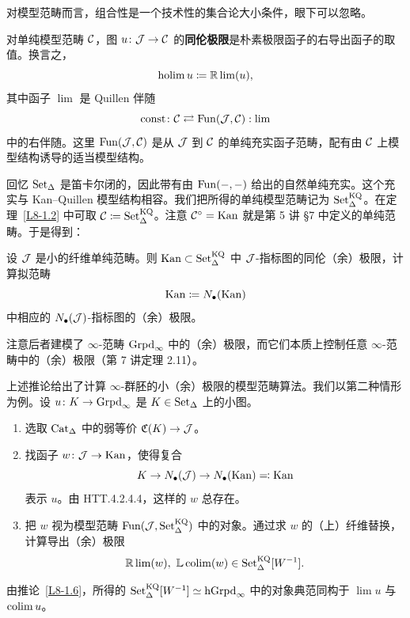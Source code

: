 对模型范畴而言，组合性是一个技术性的集合论大小条件，眼下可以忽略。

对单纯模型范畴 $\mathcal{C}$，图 $u\colon \mathcal{J}\to\mathcal{C}$ 的\textbf{同伦极限}是朴素极限函子的右导出函子的取值。换言之，
\[
\operatorname{holim} u\coloneqq \mathbb{R}\lim(u),
\]
其中函子 $\lim$ 是 Quillen 伴随
\[
\mathrm{const}\colon \mathcal{C}\rightleftarrows \operatorname{Fun}(\mathcal{J},\mathcal{C}) : \lim
\]
中的右伴随。这里 $\operatorname{Fun}(\mathcal{J},\mathcal{C})$ 是从 $\mathcal{J}$ 到 $\mathcal{C}$ 的单纯充实函子范畴，配有由 $\mathcal{C}$ 上模型结构诱导的适当模型结构。

\nitem\label{L8-1.5} 回忆 $\operatorname{Set}_\Delta$ 是笛卡尔闭的，因此带有由 $\operatorname{Fun}(-,-)$ 给出的自然单纯充实。这个充实与 Kan--Quillen 模型结构相容。我们把所得的单纯模型范畴记为 $\operatorname{Set}^{\mathrm{KQ}}_\Delta$。在定理~\ref{L8-1.2} 中可取 $\mathcal{C}\coloneqq \operatorname{Set}^{\mathrm{KQ}}_\Delta$。注意 $\mathcal{C}^{\circ}=\operatorname{Kan}$ 就是第 5 讲 §7 中定义的单纯范畴。于是得到：

\begin{corollary}\label{L8-1.6}
设 $\mathcal{J}$ 是小的纤维单纯范畴。则 $\operatorname{Kan}\subset \operatorname{Set}^{\mathrm{KQ}}_\Delta$ 中 $\mathcal{J}$-指标图的同伦（余）极限，计算拟范畴
\[
\operatorname{Kan} \coloneqq N_\bullet(\operatorname{Kan})
\]
中相应的 $N_\bullet(\mathcal{J})$-指标图的（余）极限。
\end{corollary}

\begin{remark}\label{L8-1.7}
注意后者建模了 $\infty$-范畴 $\operatorname{Grpd}_\infty$ 中的（余）极限，而它们本质上控制任意 $\infty$-范畴中的（余）极限（第 7 讲定理 2.11）。
\end{remark}

\begin{remark}\label{L8-1.8}
上述推论给出了计算 $\infty$-群胚的小（余）极限的模型范畴算法。我们以第二种情形为例。设 $u\colon K\to \operatorname{Grpd}_\infty$ 是 $K\in\operatorname{Set}_\Delta$ 上的小图。
\begin{enumerate}[label=(\roman*),leftmargin=2.8em,itemsep=0.2em]
\item 选取 $\operatorname{Cat}_\Delta$ 中的弱等价 $\mathfrak{C}(K)\to \mathcal{J}$。
\item 找函子 $w\colon \mathcal{J}\to \operatorname{Kan}$，使得复合
\[
K\to N_\bullet(\mathcal{J})\to N_\bullet(\operatorname{Kan})\eqqcolon \operatorname{Kan}
\]
表示 $u$。由 HTT.4.2.4.4，这样的 $w$ 总存在。
\item 把 $w$ 视为模型范畴 $\operatorname{Fun}(\mathcal{J},\operatorname{Set}^{\mathrm{KQ}}_\Delta)$ 中的对象。通过求 $w$ 的（上）纤维替换，计算导出（余）极限
\[
\mathbb{R}\lim(w),\ \mathbb{L}\operatorname{colim}(w)\in \operatorname{Set}^{\mathrm{KQ}}_\Delta[W^{-1}].
\]
\end{enumerate}
由推论~\ref{L8-1.6}，所得的 $\operatorname{Set}^{\mathrm{KQ}}_\Delta[W^{-1}]\simeq \operatorname{hGrpd}_\infty$ 中的对象典范同构于 $\lim u$ 与 $\operatorname{colim} u$。
\end{remark}

